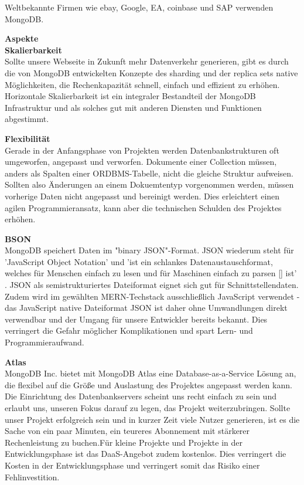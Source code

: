 Weltbekannte Firmen wie ebay, Google, EA, coinbase und SAP verwenden MongoDB. \cite{MG1}

\textbf{Aspekte}\\

\textbf{Skalierbarkeit}\\
Sollte unsere Webseite in Zukunft mehr Datenverkehr generieren, gibt es durch die von MongoDB entwickelten Konzepte des sharding und der replica sets native Möglichkeiten, die Rechenkapazität schnell, einfach und effizient zu erhöhen. Horizontale Skalierbarkeit ist ein integraler Bestandteil der MongoDB Infrastruktur und als solches gut mit anderen Diensten und Funktionen abgestimmt.

\textbf{Flexibilität}\\
Gerade in der Anfangsphase von Projekten werden Datenbankstrukturen oft umgeworfen, angepasst und verworfen. Dokumente einer Collection müssen, anders als Spalten einer ORDBMS-Tabelle, nicht die gleiche Struktur aufweisen. Sollten also Änderungen an einem Dokuemtentyp vorgenommen werden, müssen vorherige Daten nicht angepasst und bereinigt werden. Dies erleichtert einen agilen Programmieransatz, kann aber die technischen Schulden des Projektes erhöhen.

\textbf{BSON}\\
MongoDB speichert Daten im "binary JSON"-Format. JSON wiederum steht für 'JavaScript Object Notation' und 'ist ein schlankes Datenaustauschformat, welches für Menschen einfach zu lesen und für Maschinen einfach zu parsen [] ist' \cite{JSON1}. JSON als semistrukturiertes Dateiformat eignet sich gut für Schnittstellendaten. Zudem wird im gewählten MERN-Techstack ausschließlich JavaScript verwendet - das JavaScript native Dateiformat JSON ist daher ohne Umwandlungen direkt verwendbar und der Umgang für unsere Entwickler bereits bekannt. Dies verringert die Gefahr möglicher Komplikationen und spart Lern- und Programmieraufwand.


\textbf{Atlas}\\
MongoDB Inc. bietet mit MongoDB Atlas eine Database-as-a-Service Lösung an, die flexibel auf die Größe und Auslastung des Projektes angepasst werden kann. Die Einrichtung des Datenbankservers scheint uns recht einfach zu sein und erlaubt uns, unseren Fokus darauf zu legen, das Projekt weiterzubringen. Sollte unser Projekt erfolgreich sein und in kurzer Zeit viele Nutzer generieren, ist es die Sache von ein paar Minuten, ein teureres Abonnement mit stärkerer Rechenleistung zu buchen.Für kleine Projekte und Projekte in der Entwicklungsphase ist das DaaS-Angebot zudem kostenlos. Dies verringert die Kosten in der Entwicklungsphase und verringert somit das Risiko einer Fehlinvestition.

